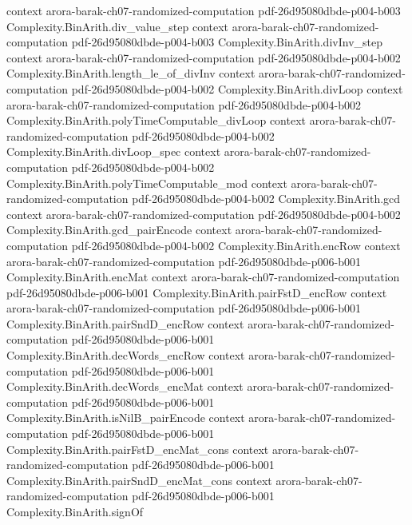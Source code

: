 \begin{theorem}
  {context}
  {arora-barak-ch07-randomized-computation}
  {pdf-26d95080dbde-p004-b003}
\proofstep
  {Complexity.BinArith.div_value_step}
  {context}
  {arora-barak-ch07-randomized-computation}
  {pdf-26d95080dbde-p004-b003}
\proofstep
  {Complexity.BinArith.divInv_step}
  {context}
  {arora-barak-ch07-randomized-computation}
  {pdf-26d95080dbde-p004-b002}
\proofstep
  {Complexity.BinArith.length_le_of_divInv}
  {context}
  {arora-barak-ch07-randomized-computation}
  {pdf-26d95080dbde-p004-b002}
\proofstep
  {Complexity.BinArith.divLoop}
  {context}
  {arora-barak-ch07-randomized-computation}
  {pdf-26d95080dbde-p004-b002}
\proofstep
  {Complexity.BinArith.polyTimeComputable_divLoop}
  {context}
  {arora-barak-ch07-randomized-computation}
  {pdf-26d95080dbde-p004-b002}
\proofstep
  {Complexity.BinArith.divLoop_spec}
  {context}
  {arora-barak-ch07-randomized-computation}
  {pdf-26d95080dbde-p004-b002}
\proofstep
  {Complexity.BinArith.polyTimeComputable_mod}
  {context}
  {arora-barak-ch07-randomized-computation}
  {pdf-26d95080dbde-p004-b002}
\proofstep
  {Complexity.BinArith.gcd}
  {context}
  {arora-barak-ch07-randomized-computation}
  {pdf-26d95080dbde-p004-b002}
\proofstep
  {Complexity.BinArith.gcd_pairEncode}
  {context}
  {arora-barak-ch07-randomized-computation}
  {pdf-26d95080dbde-p004-b002}
\proofstep
  {Complexity.BinArith.encRow}
  {context}
  {arora-barak-ch07-randomized-computation}
  {pdf-26d95080dbde-p006-b001}
\proofstep
  {Complexity.BinArith.encMat}
  {context}
  {arora-barak-ch07-randomized-computation}
  {pdf-26d95080dbde-p006-b001}
\proofstep
  {Complexity.BinArith.pairFstD_encRow}
  {context}
  {arora-barak-ch07-randomized-computation}
  {pdf-26d95080dbde-p006-b001}
\proofstep
  {Complexity.BinArith.pairSndD_encRow}
  {context}
  {arora-barak-ch07-randomized-computation}
  {pdf-26d95080dbde-p006-b001}
\proofstep
  {Complexity.BinArith.decWords_encRow}
  {context}
  {arora-barak-ch07-randomized-computation}
  {pdf-26d95080dbde-p006-b001}
\proofstep
  {Complexity.BinArith.decWords_encMat}
  {context}
  {arora-barak-ch07-randomized-computation}
  {pdf-26d95080dbde-p006-b001}
\proofstep
  {Complexity.BinArith.isNilB_pairEncode}
  {context}
  {arora-barak-ch07-randomized-computation}
  {pdf-26d95080dbde-p006-b001}
\proofstep
  {Complexity.BinArith.pairFstD_encMat_cons}
  {context}
  {arora-barak-ch07-randomized-computation}
  {pdf-26d95080dbde-p006-b001}
\proofstep
  {Complexity.BinArith.pairSndD_encMat_cons}
  {context}
  {arora-barak-ch07-randomized-computation}
  {pdf-26d95080dbde-p006-b001}
\proofstep
  {Complexity.BinArith.signOf}

\end{theorem}
